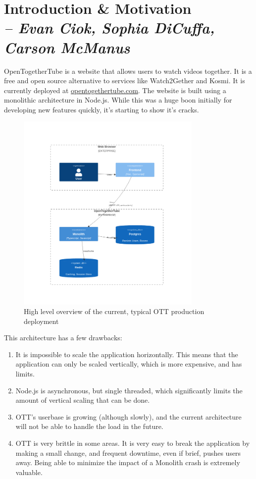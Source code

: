 \chapter{Introduction \& Motivation \\
  \small{\textit{-- Evan Ciok, Sophia DiCuffa, Carson McManus}}
  \label{Chapter::Motivation}}

OpenTogetherTube is a website that allows users to watch videos together. It is a free and open source alternative to services like Watch2Gether and Kosmi. It is currently deployed at \href{https://opentogethertube.com}{opentogethertube.com}. The website is built using a monolithic architecture in Node.js. While this was a huge boon initially for developing new features quickly, it's starting to show it's cracks.

\begin{figure}[!h]
  \centering
  \includegraphics[width=0.8\textwidth]{Figures/deployment-current.png}
  \caption{High level overview of the current, typical OTT production deployment}
  \label{Figure::deployment-current}
\end{figure}

This architecture has a few drawbacks:

\begin{enumerate}
  \item It is impossible to scale the application horizontally. This means that the application can only be scaled vertically, which is more expensive, and has limits.
  \item Node.js is asynchronous, but single threaded, which significantly limits the amount of vertical scaling that can be done.
  \item OTT's userbase is growing (although slowly), and the current architecture will not be able to handle the load in the future.
  \item OTT is very brittle in some areas. It is very easy to break the application by making a small change, and frequent downtime, even if brief, pushes users away. Being able to minimize the impact of a Monolith crash is extremely valuable.
\end{enumerate}


